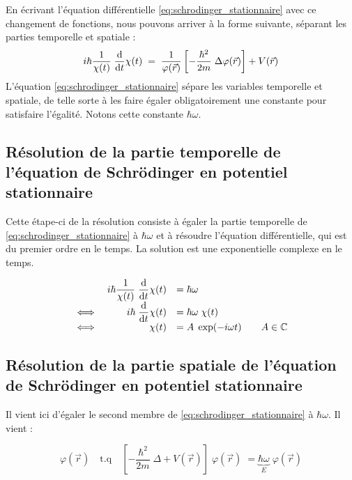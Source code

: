 En écrivant l'équation différentielle \eqref{eq:schrodinger_stationnaire} avec ce changement de fonctions, nous pouvons arriver à la forme suivante, séparant les parties temporelle et spatiale :
\begin{equation}
i\hbar \dfrac{1}{\chi(t)} \; \dfrac{\mathrm{d}}{\mathrm{d}t} \chi(t) \; = \; \dfrac{1}{\varphi(\vec r)} \left[ -\dfrac{\hbar ^2}{2m} \; \Delta \varphi(\vec r) \right] + V(\vec r)
\end{equation}
L'équation \eqref{eq:schrodinger_stationnaire} sépare les variables temporelle et spatiale, de telle sorte à les faire égaler obligatoirement une constante pour satisfaire l'égalité. Notons cette constante $\hbar \omega$. 
\subsection{Résolution de la partie temporelle de l'équation de Schrödinger en potentiel stationnaire}
Cette étape-ci de la résolution consiste à égaler la partie temporelle de \eqref{eq:schrodinger_stationnaire} à $\hbar \omega$ et à résoudre l'équation différentielle, qui est du premier ordre en le temps. La solution est une exponentielle complexe en le temps.

\begin{equation} \label{eq:resol_stat_temps}
\begin{array}{lrl r}
& i\hbar \dfrac{1}{\chi(t)} \; \dfrac{\mathrm{d}}{\mathrm{d}t} \chi(t) &= \hbar \omega  &\\
\iff& i \hbar \; \dfrac{\mathrm{d}}{\mathrm{d}t} \chi(t) &= \hbar \omega \;  \chi(t)  &\\
\iff & \chi(t) &= A \; \exp(-i\omega t)  &\quad A \in \mathbb{C}
\end{array}
\end{equation}


\subsection{Résolution de la partie spatiale de l'équation de Schrödinger en potentiel stationnaire}
Il vient ici d'égaler le second membre de \eqref{eq:schrodinger_stationnaire} à $\hbar \omega$. Il vient :

\begin{equation} \label{eq:resol_stat_pos}
\varphi(\vec r) \quad \mathrm{t.q} \quad \left[-\dfrac{\hbar ^2}{2m} \; \Delta + V(\vec r) \right] \; \varphi(\vec r) \; = \underbrace{\hbar	\omega}_E \; \varphi(\vec r)
\end{equation}


